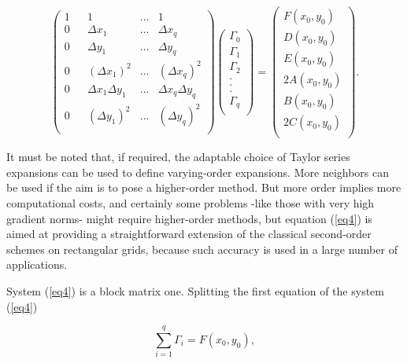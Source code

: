\documentclass[a4paper,fleqn]{cas-sc}
\begin{document}
\begin{equation}
  \left(
    \begin{array}{rrrrr}
    1&  &1 &... & 1\\
    0&  &\Delta x_1 &... &\Delta x_q\\
    0&  &\Delta y_1 &... &\Delta y_q\\
    0&  &(\Delta x_1)^2 &... &(\Delta x_q)^2\\
    0&  &\Delta x_1\Delta y_1 &... &\Delta x_q\Delta y_q\\
    0&  &(\Delta y_1)^2 &... &(\Delta y_q)^2\\
    \end{array}
    \right)
    \left(
    \begin{array}{lclcl}
    \Gamma_0\\
    \Gamma_1\\
    \Gamma_2\\
    .\\
    .\\
    .\\
    \Gamma_q\\
    \end{array}
    \right)=
    \left(
    \begin{array}{rclcl}
    F(x_0,y_0)\\
    D(x_0,y_0)\\
    E(x_0,y_0)\\
    2A(x_0,y_0)\\
    B(x_0,y_0)\\
    2C(x_0,y_0)\\
    \end{array}
    \right) . 
    \label{eq4}
\end{equation}

{
It must be noted that, if required, the adaptable choice of Taylor series expansions can be used to define varying-order expansions. More neighbors can be used if the aim is to pose a higher-order method. But more order implies more computational costs, and certainly some problems -like those with very high gradient norms- might require higher-order methods, but equation (\ref{eq4}) is aimed at providing a straightforward extension of the classical second-order schemes on rectangular grids, because such accuracy is used in a large number of applications.
}

System (\ref{eq4}) is a block matrix one. Splitting the first equation of the system (\ref{eq4})

\begin{equation}\label{eq5}
  \sum _{i=1}^q \Gamma_i=F(x_0,y_0),
\end{equation}
\end{document}
